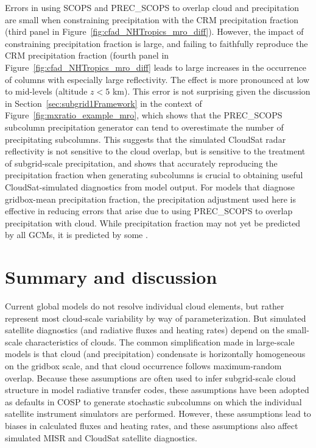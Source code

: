 Errors in using SCOPS and PREC\_SCOPS to overlap cloud and precipitation
are small when constraining precipitation with the CRM precipitation
fraction (third panel in Figure~\ref{fig:cfad_NHTropics_mro_diff}).
However, the impact of constraining precipitation fraction is large, and
failing to faithfully reproduce the CRM precipitation fraction (fourth
panel in Figure~\ref{fig:cfad_NHTropics_mro_diff} leads to large
increases in the occurrence of columns with especially large
reflectivity. The effect is more pronounced at low to mid-levels
(altitude \(z < 5\) km). This error is not surprising given the
discussion in Section~\ref{sec:subgrid1Framework} in the context of
Figure~\ref{fig:mxratio_example_mro}, which shows that the PREC\_SCOPS
subcolumn precipitation generator can tend to overestimate the number of
precipitating subcolumns. This suggests that the simulated CloudSat
radar reflectivity is not sensitive to the cloud overlap, but is
sensitive to the treatment of subgrid-scale precipitation, and shows
that accurately reproducing the precipitation fraction when generating
subcolumns is crucial to obtaining useful CloudSat-simulated diagnostics
from model output. For models that diagnose gridbox-mean precipitation
fraction, the precipitation adjustment used here is effective in
reducing errors that arise due to using PREC\_SCOPS to overlap
precipitation with cloud. While precipitation fraction may not yet be
predicted by all GCMs, it is predicted by some \citep[e.g.,
CAM;][]{neale_et_al_2010a, neale_et_al_2010b}.

\section{Summary and discussion}\label{sec:subgrid1Summary}

Current global models do not resolve individual cloud elements, but
rather represent most cloud-scale variability by way of
parameterization. But simulated satellite diagnostics (and radiative
fluxes and heating rates) depend on the small-scale characteristics of
clouds. The common simplification made in large-scale models is that
cloud (and precipitation) condensate is horizontally homogeneous on the
gridbox scale, and that cloud occurrence follows maximum-random overlap.
Because these assumptions are often used to infer subgrid-scale cloud
structure in model radiative transfer codes, these assumptions have been
adopted as defaults in COSP to generate stochastic subcolumns on which
the individual satellite instrument simulators are performed. However,
these assumptions lead to biases in calculated fluxes and heating rates,
and these assumptions also affect simulated MISR and CloudSat satellite
diagnostics.

